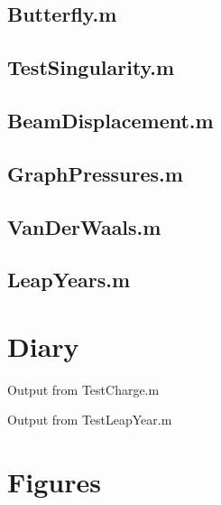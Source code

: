\documentclass{article}
\begin{document}
\subsection{Butterfly.m}

\subsection{TestSingularity.m}

\subsection{BeamDisplacement.m}

\subsection{GraphPressures.m}

\subsection{VanDerWaals.m}

\subsection{LeapYears.m}
\clearpage %

\section{Diary}
\begin{table}[htb!]
\begin{center}
\caption{Output from TestCharge.m\label{ChargeTest}}
\end{center}
\end{table}

\begin{table}[htb!]
\begin{center}
\caption{Output from TestLeapYear.m\label{LeapYearsTest}}
\end{center}
\end{table}
\clearpage %

\section{Figures}
\end{document}
